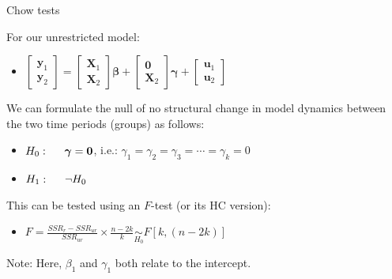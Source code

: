 \documentclass{beamer}
\begin{document}
\begin{frame}{Chow tests}

For  our unrestricted model:
\vspace{0.3cm}

\begin{itemize}

\item 
$ \begin{bmatrix} \bm{y}_1 \\ \bm{y}_2 \end{bmatrix} = 
\begin{bmatrix} \bm{X}_1 \\ \bm{X}_2 \end{bmatrix} \bm{\beta} +
\begin{bmatrix} \bm{0} \\ \bm{X}_2 \end{bmatrix} \bm{\gamma} +
\begin{bmatrix} \bm{u}_1 \\ \bm{u}_2 \end{bmatrix}$ \\
\vspace{0.3cm}
\end{itemize}

We can formulate the null of no structural change in model dynamics between the two time periods (groups) as follows:

\begin{itemize}
\item 
$ H_0: \hspace{0.5cm} \bm{\gamma}= \bm{0}$, i.e.: 
$\gamma_1 = \gamma_2 = \gamma_3= \cdots = \gamma_k=0 $
\item 
$ H_1: \hspace{0.5cm} \neg H_0$ 
\end{itemize}

This can be tested using an $F$-test (or its HC version): 
\vspace{0.3cm}
\begin{itemize}
\item 
$ F = \frac{\textit{SSR}_r- \textit{SSR}_{\textit{ur}}}{\textit{SSR}_{\textit{ur}}} \times \frac{n-2k}{k} \underset{H_0}{\sim } 
F[k, (n-2k)] $ 
\end{itemize}

\medskip
\small{Note: Here, $\beta_1$ and $\gamma_1$ both relate to the intercept.}

\end{frame}
\end{document}
